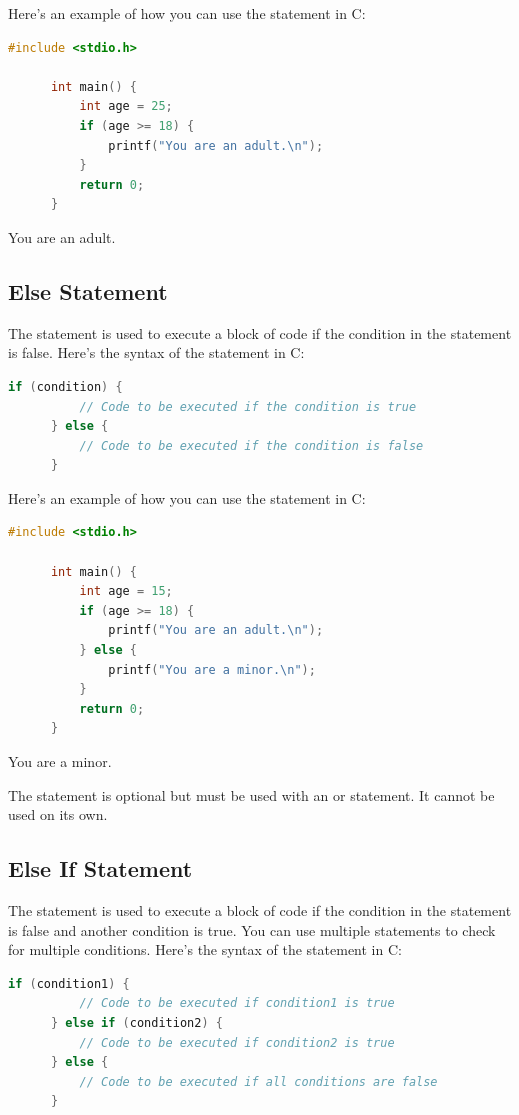 \documentclass[12pt, openany]{book}
\begin{document}
  Here's an example of how you can use the  statement in C:
  \begin{lstlisting}[language=C, caption=Using If Statement in C]
      #include <stdio.h>
      
      int main() {
          int age = 25;
          if (age >= 18) {
              printf("You are an adult.\n");
          }
          return 0;
      }
  \end{lstlisting}
  \begin{tcolorbox}[colback=lightgray!10, colframe=black, title=Output]
      You are an adult.
  \end{tcolorbox}
  
  \subsection{Else Statement}
  The  statement is used to execute a block of code if the condition in the  statement is false. Here's the syntax of the  statement in C:
  \begin{lstlisting}[language=C, caption=Else Statement Syntax]
      if (condition) {
          // Code to be executed if the condition is true
      } else {
          // Code to be executed if the condition is false
      }
  \end{lstlisting}
  
  Here's an example of how you can use the  statement in C:
  \begin{lstlisting}[language=C, caption=Using Else Statement in C]
      #include <stdio.h>
      
      int main() {
          int age = 15;
          if (age >= 18) {
              printf("You are an adult.\n");
          } else {
              printf("You are a minor.\n");
          }
          return 0;
      }
  \end{lstlisting}
  \begin{tcolorbox}[colback=lightgray!10, colframe=black, title=Output]
      You are a minor.
  \end{tcolorbox}
  
  \begin{infobox}
      The  statement is optional but must be used with an  or  statement. It cannot be used on its own.
  \end{infobox}
  
  \subsection{Else If Statement}
  The  statement is used to execute a block of code if the condition in the  statement is false and another condition is true. You can use multiple  statements to check for multiple conditions. Here's the syntax of the  statement in C:
  \begin{lstlisting}[language=C, caption=Else If Statement Syntax]
      if (condition1) {
          // Code to be executed if condition1 is true
      } else if (condition2) {
          // Code to be executed if condition2 is true
      } else {
          // Code to be executed if all conditions are false
      }
  \end{lstlisting}
  
\end{document}
